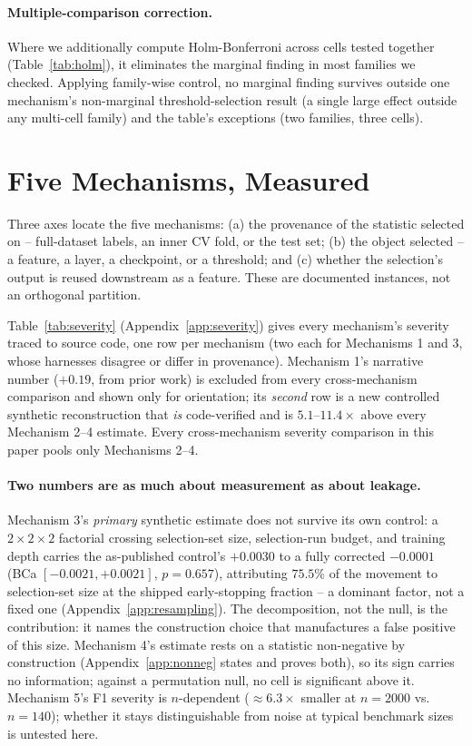 \documentclass{article}
\begin{document}
\paragraph{Multiple-comparison correction.} Where we additionally compute
Holm-Bonferroni across cells tested together (Table~\ref{tab:holm}), it
eliminates the marginal finding in most families we checked.
Applying family-wise control, no marginal finding survives outside
one mechanism's non-marginal threshold-selection result (a single large
effect outside any multi-cell family) and the table's exceptions (two
families, three cells).


\section{Five Mechanisms, Measured}
\label{sec:mechanisms}

Three axes locate the five mechanisms: (a) the provenance of the statistic
selected on -- full-dataset labels, an inner CV fold, or the test set; (b)
the object selected -- a feature, a layer, a checkpoint, or a threshold; and
(c) whether the selection's output is reused downstream as a feature. These
are documented instances, not an orthogonal partition.


Table~\ref{tab:severity} (Appendix~\ref{app:severity}) gives every
mechanism's severity traced to source code, one row per mechanism (two each for Mechanisms 1 and 3, whose harnesses disagree
or differ in provenance). Mechanism 1's narrative number ($+0.19$, from prior
work) is excluded from every cross-mechanism comparison and shown only for
orientation; its \emph{second} row is a new controlled synthetic
reconstruction that \emph{is} code-verified and is $5.1$--$11.4\times$
above every Mechanism 2--4 estimate. Every cross-mechanism severity comparison in this
paper pools only Mechanisms 2--4.



\paragraph{Two numbers are as much about measurement as about leakage.}
Mechanism 3's \emph{primary} synthetic estimate does not survive its own
control: a $2\times2\times2$ factorial crossing selection-set size,
selection-run budget, and training depth carries the as-published control's
$+0.0030$ to a fully corrected $-0.0001$ (BCa $[-0.0021,+0.0021]$,
$p=0.657$), attributing $75.5\%$ of the movement to selection-set size at the
shipped early-stopping fraction -- a dominant factor, not a fixed one
(Appendix~\ref{app:resampling}).
The decomposition, not the null, is the contribution: it names the
construction choice that manufactures a false positive of this size.
Mechanism 4's estimate rests on a statistic non-negative by construction
(Appendix~\ref{app:nonneg} states and proves both), so its sign carries no
information; against a permutation null, no cell is significant above it.
Mechanism 5's F1 severity is $n$-dependent ($\approx6.3\times$ smaller at
$n{=}2000$ vs.\ $n{=}140$); whether it stays distinguishable from noise at
typical benchmark sizes is untested here.
\end{document}
